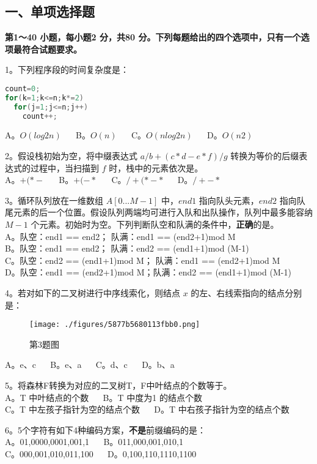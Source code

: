 
\subsection{一、单项选择题}
\textbf{第1～40 小题，每小题2 分，共80 分。下列每题给出的四个选项中，只有一个选项最符合试题要求。}

1。下列程序段的时间复杂度是：
\begin{lstlisting}[language=cpp]
count=0;
for(k=1;k<=n;k*=2)
  for(j=1;j<=n;j++)
    count++;
\end{lstlisting}
A。$O(log2n)$ $\quad$ B。$O(n)$ $\quad$ C。$O(nlog2n)$ $\quad$ D。$O(n2)$

2。假设栈初始为空，将中缀表达式 $a/b+(c*d-e*f)/g$ 转换为等价的后缀表达式的过程中，当扫描到 $f$ 时，栈中的元素依次是。 \\
A。$+ ( * -$  $\quad$ B。$+ ( - *$  $\quad$ C。$/ + ( * - *$  $\quad$ D。$/ + - *$

3。循环队列放在一维数组 $A[0...M-1]$ 中，$end1$ 指向队头元素，$end2$ 指向队尾元素的后一个位置。假设队列两端均可进行入队和出队操作，队列中最多能容纳 $M-1$ 个元素。初始时为空。下列判断队空和队满的条件中，\textbf{正确}的是。 \\
A。队空：end1 == end2； 队满：end1 == (end2+1)mod M \\
B。队空：end1 == end2； 队满：end2 == (end1+1)mod (M-1) \\
C。队空：end2 == (end1+1)mod M； 队满：end1 == (end2+1)mod M \\
D。队空：end1 == (end2+1)mod M；队满：end2 == (end1+1)mod (M-1)

4。若对如下的二叉树进行中序线索化，则结点 $x$ 的左、右线索指向的结点分别是：
\begin{figure}[ht]
\centering
\texttt{[image: ./figures/5877b5680113fbb0.png]}
\caption{第3题图} \label{fig_CSN14_1}
\end{figure}
A。e、c $\quad$ B。e、a $\quad$ C。d、c $\quad$ D。b、a

5。将森林F转换为对应的二叉树T，F中叶结点的个数等于。 \\
A。T 中叶结点的个数 $\quad$ B。T 中度为1 的结点个数 \\
C。T 中左孩子指针为空的结点个数 $\quad$ D。T 中右孩子指针为空的结点个数

6。5个字符有如下4种编码方案，\textbf{不是}前缀编码的是： \\
A。01,0000,0001,001,1 $\quad$ B。011,000,001,010,1 \\
C。000,001,010,011,100 $\quad$ D。0,100,110,1110,1100

